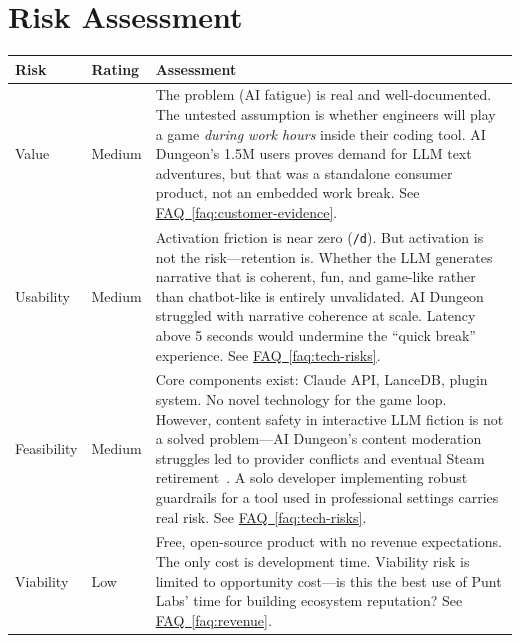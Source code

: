 \documentclass[11pt,letterpaper]{article}
\newcommand{\faqref}[1]{\hyperref[#1]{FAQ~\ref*{#1}}}
\begin{document}
\newpage
\section*{Risk Assessment}

\renewcommand{\arraystretch}{1.6}
\begin{tabularx}{\textwidth}{@{} l l X @{}}
\toprule
\textbf{\color{SectionBlue}Risk} & \textbf{\color{SectionBlue}Rating} & \textbf{\color{SectionBlue}Assessment} \\
\midrule
Value      & \textcolor{RiskAmber}{Medium} & The problem (AI fatigue) is real and well-documented. The untested assumption is whether engineers will play a game \emph{during work hours} inside their coding tool. AI Dungeon's 1.5M users proves demand for LLM text adventures, but that was a standalone consumer product, not an embedded work break. See \faqref{faq:customer-evidence}. \\
Usability  & \textcolor{RiskAmber}{Medium} & Activation friction is near zero (\texttt{/d}). But activation is not the risk---retention is. Whether the LLM generates narrative that is coherent, fun, and game-like rather than chatbot-like is entirely unvalidated. AI Dungeon struggled with narrative coherence at scale. Latency above 5 seconds would undermine the ``quick break'' experience. See \faqref{faq:tech-risks}. \\
Feasibility & \textcolor{RiskAmber}{Medium} & Core components exist: Claude API, LanceDB, plugin system. No novel technology for the game loop. However, content safety in interactive LLM fiction is not a solved problem---AI Dungeon's content moderation struggles led to provider conflicts and eventual Steam retirement~\cite{ai212023latitude}. A solo developer implementing robust guardrails for a tool used in professional settings carries real risk. See \faqref{faq:tech-risks}. \\
Viability  & \textcolor{RiskGreen}{Low} & Free, open-source product with no revenue expectations. The only cost is development time. Viability risk is limited to opportunity cost---is this the best use of Punt Labs' time for building ecosystem reputation? See \faqref{faq:revenue}. \\
\bottomrule
\end{tabularx}
\renewcommand{\arraystretch}{1.0}

\end{document}
